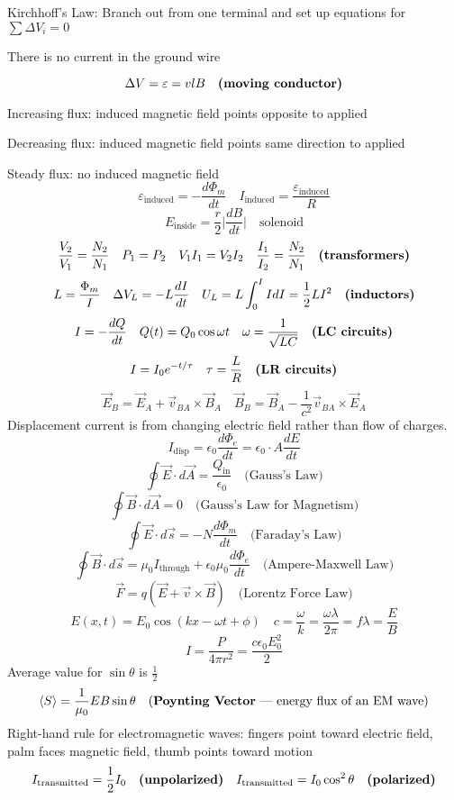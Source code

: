 \documentclass[8pt,twocolumn]{extarticle}
\begin{document}
Kirchhoff's Law: Branch out from one terminal and set up equations for $\sum \Delta V_i = 0$
\vspace{1em}

There is no current in the ground wire

\[\Delta V = \varepsilon = vlB\quad\text{\textbf{(moving conductor)}}\]
\pagebreak

Increasing flux: induced magnetic field points opposite to applied

Decreasing flux: induced magnetic field points same direction to applied

Steady flux: no induced magnetic field
\[\varepsilon_\text{induced} = -\frac{d\Phi_m}{dt}\quad I_\text{induced}=\frac{\varepsilon_\text{induced}}{R}\]
\[E_\text{inside}=\frac{r}{2}\Big|\frac{dB}{dt}\Big|\quad\text{solenoid}\]
\[\frac{V_2}{V_1} = \frac{N_2}{N_1}\quad P_1=P_2\quad V_1 I_1 = V_2 I_2\quad\frac{I_1}{I_2}=\frac{N_2}{N_1}\quad\text{\textbf{(transformers)}}\]
\[L=\frac{\Phi_m}{I}\quad \Delta V_L = -L\frac{dI}{dt}\quad U_L = L\int_{0}^{I}IdI = \frac{1}{2}LI^2\quad\text{\textbf{(inductors)}}\]
\[I=-\frac{dQ}{dt}\quad Q(t)=Q_0\cos\omega t\quad \omega = \frac{1}{\sqrt{LC}}\quad\text{\textbf{(LC circuits)}}\]
\[I=I_0 e^{-t/\tau}\quad\tau = \frac{L}{R}\quad\text{\textbf{(LR circuits)}}\]
\[\vec{E}_B = \vec{E}_A + \vec{v}_{BA}\times \vec{B}_A\quad \vec{B}_B = \vec{B}_A - \frac{1}{c^2}\vec{v}_{BA}\times \vec{E}_A\]
Displacement current is from changing electric field rather than flow of charges.
\[I_\text{disp}=\epsilon_0\frac{d\Phi_e}{dt}=\epsilon_0 \cdot A \frac{dE}{dt}\]
\[\oint\vec{E}\cdot d\vec{A}=\frac{Q_\text{in}}{\epsilon_0}\quad\text{(Gauss's Law)}\]
\[\oint\vec{B}\cdot d\vec{A}=0\quad\text{(Gauss's Law for Magnetism)}\]
\[\oint\vec{E}\cdot d\vec{s} = -N\frac{d\Phi_m}{dt}\quad\text{(Faraday's Law)}\]
\[\oint\vec{B}\cdot d\vec{s} = \mu_0 I_\text{through} + \epsilon_0 \mu_0 \frac{d\Phi_e}{dt}\quad\text{(Ampere-Maxwell Law)}\]
\[\vec{F}=q(\vec{E} + \vec{v} \times \vec{B})\quad\text{(Lorentz Force Law)}\]
\[E(x, t) = E_0 \cos\left(kx - \omega t + \phi\right)\quad c=\frac{\omega}{k}=\frac{\omega\lambda}{2\pi}=f\lambda=\frac{E}{B}\]
\[I=\frac{P}{4\pi r^2}=\frac{c\epsilon_0 E_0^2}{2}\]
Average value for $\sin\theta$ is $\frac{1}{2}$
\[\langle S \rangle = \frac{1}{\mu_0}EB\sin\theta\quad\text{(\textbf{Poynting Vector} --- energy flux of an EM wave)}\]
Right-hand rule for electromagnetic waves: fingers point toward electric field, palm faces magnetic field, thumb points toward motion
\[I_\text{transmitted}=\frac{1}{2} I_0\quad\text{\textbf{(unpolarized)}}\quad I_\text{transmitted}=I_0\cos^2
\theta\quad\text{\textbf{(polarized)}}\]
\end{document}
